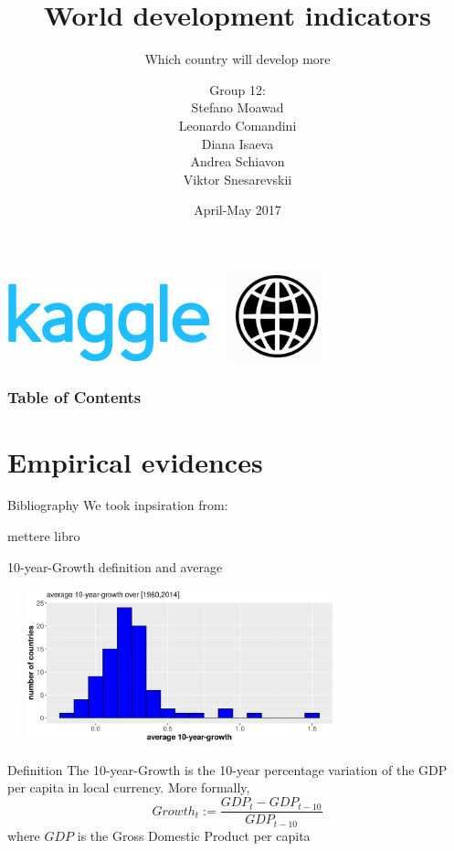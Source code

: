 \documentclass[9pt]{beamer}
\title[World development indicators]{\huge World development indicators}
\subtitle[Which country will develop more]{\large Which country will develop more}
\author[Moawad, Comandini, Isaeva, Schiavon, Snesarevskii] {{\Large Group 12:\\}Stefano Moawad\\Leonardo Comandini\\Diana Isaeva\\Andrea Schiavon\\Viktor Snesarevskii}
\date{April-May 2017}
\begin{document}
	\begin{frame}
	\titlepage
	\vfill
	\begin{flushright}
		\includegraphics[height=.7cm]{kaggle.png}\quad
		\includegraphics[height=.7cm]{worldbank.jpg}
	\end{flushright}
\end{frame}

\begin{frame}
	\frametitle{Table of Contents}
	\tableofcontents
\end{frame}


\section{Empirical evidences}

\begin{frame}{Bibliography}
   We took inpsiration from:
   
   mettere libro
   
\end{frame}

\begin{frame}{10-year-Growth definition and average}
	\begin{block}{}
		\includegraphics[height=4.5cm,width=10cm]{growth_hist.png}
	\end{block}
	\begin{block}{Definition}
		 The \alert{10-year-Growth} is the 10-year percentage variation of the GDP per capita in local currency. More formally,
		\begin{equation}
		Growth_{t} := \frac{GDP_{t}-GDP_{t-10}}{GDP_{t-10}}
		\end{equation}
		where $ GDP $ is the Gross Domestic Product per capita
		
	\end{block}
\end{frame}
\end{document}
